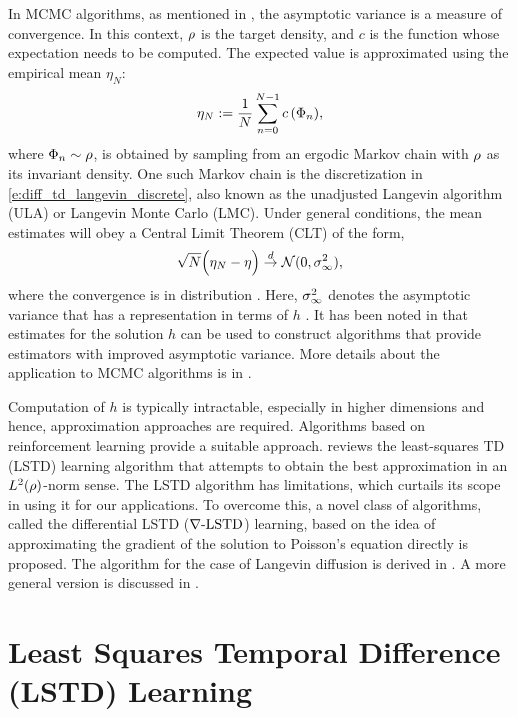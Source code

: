 In MCMC algorithms, as mentioned in , the asymptotic variance is a measure of convergence. In this context, $\rho$ is the target density, and $c$ is the function whose expectation needs to be computed. The expected value is approximated using the empirical mean $\eta_N$:
\begin{equation} \eta_N := \frac{1}{N} \sum_{n=0}^{N-1} c\,(\Phi_n),\end{equation}
where $\Phi_n \sim \rho$, is obtained by sampling from an ergodic Markov chain with $\rho$ as its invariant density. One such Markov chain is the discretization in \eqref{e:diff_td_langevin_discrete}, also known as the unadjusted Langevin algorithm (ULA) or Langevin Monte Carlo (LMC). Under general conditions, the mean estimates will obey a Central Limit Theorem (CLT) of the form,
\begin{equation}
\sqrt{N} \Bigl( \eta_N - \eta \Bigr) \overset{d}{\to} \mathcal{N}(0,\sigma_\infty ^2),
\end{equation}
where the convergence is in distribution \cite{MT,bha82}. Here, $\sigma_\infty^2$ denotes the asymptotic variance that has a representation in terms of $h$ \cite{glymey96a,MT,asmgly07}. It has been noted in \cite{henthesis97, delkon12} that estimates for the solution $h$ can be used to construct algorithms that provide estimators with improved asymptotic variance. More details about the application to MCMC algorithms is in . 

Computation of $h$ is typically intractable, especially in higher dimensions and hence, approximation approaches are required. Algorithms based on reinforcement learning provide a suitable approach.  reviews the least-squares TD (LSTD) learning algorithm that attempts to obtain the best approximation in an $L^2(\rho)$-norm sense. The LSTD algorithm has limitations, which curtails its scope in using it for our applications. To overcome this, a novel class of algorithms, called the differential LSTD ($\nabla\text{-LSTD}$) learning, based on the idea of approximating the gradient of the solution to Poisson's equation directly is proposed. The algorithm for the case of Langevin diffusion is derived in .  A more general version is discussed in . 

\section{Least Squares Temporal Difference (LSTD) Learning} 
\label{s:lstd}
